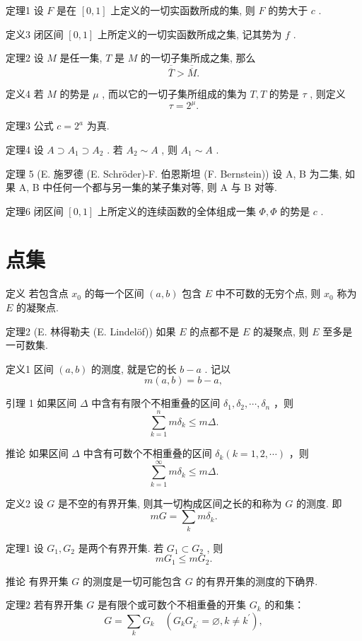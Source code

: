 \documentclass[]{article}
\begin{document}
定理1 设 $F$ 是在 $[0,1]$ 上定义的一切实函数所成的集, 则 $F$ 的势大于 $c$ . 

定义3 闭区间 $[0,1]$ 上所定义的一切实函数所成之集, 记其势为 $f$ . 

定理2 设 $M$ 是任一集, $T$ 是 $M$ 的一切子集所成之集, 那么 $$
\overline {{\overline {{T}}}} > \overline {{\overline {{M}}}}.
$$

定义4 若 $M$ 的势是 $\mu$ , 而以它的一切子集所组成的集为 $T, T$ 的势是 $\tau$ , 则定义 $$
\tau = 2 ^ {\mu}.
$$

定理3 公式 $c = 2^{a}$ 为真. 

定理4 设 $A \supset A_1 \supset A_2$ . 若 $A_2 \sim A$ , 则 $A_1 \sim A$ . 

定理 5 (E. 施罗德 (E. Schröder)-F. 伯恩斯坦 (F. Bernstein)) 设 A, B 为二集, 如果 A, B 中任何一个都与另一集的某子集对等, 则 A 与 B 对等. 

定理6 闭区间 $[0,1]$ 上所定义的连续函数的全体组成一集 $\Phi, \Phi$ 的势是 $c$ . 

\section{点集}

定义 若包含点 $x_0$ 的每一个区间 $(a, b)$ 包含 $E$ 中不可数的无穷个点, 则 $x_0$ 称为 $E$ 的凝聚点. 

定理2 (E. 林得勒夫 (E. Lindelöf)) 如果 $E$ 的点都不是 $E$ 的凝聚点, 则 $E$ 至多是一可数集. 

定义1 区间 $(a, b)$ 的测度, 就是它的长 $b - a$ . 记以 $$
m (a, b) = b - a,
$$

引理 1 如果区间 $\Delta$ 中含有有限个不相重叠的区间 $\delta_{1}, \delta_{2}, \cdots, \delta_{n}$ ，则 $$
\sum_ {k = 1} ^ {n} m \delta_ {k} \leqslant m \Delta .
$$

推论 如果区间 $\Delta$ 中含有可数个不相重叠的区间 $\delta_{k}(k=1,2,\cdots)$ ，则$$
\sum_ {k = 1} ^ {\infty} m \delta_ {k} \leqslant m \Delta .
$$

定义2 设 $G$ 是不空的有界开集, 则其一切构成区间之长的和称为 $G$ 的测度. 即 $$
m G = \sum_ {k} m \delta_ {k}.
$$

定理1 设 $G_{1}, G_{2}$ 是两个有界开集. 若 $G_{1} \subset G_{2}$ , 则 $$
m G _ {1} \leqslant m G _ {2}.
$$

推论 有界开集 $G$ 的测度是一切可能包含 $G$ 的有界开集的测度的下确界. 

定理2 若有界开集 $G$ 是有限个或可数个不相重叠的开集 $G_{k}$ 的和集：$$
G = \sum_ {k} G _ {k} \quad (G _ {k} G _ {k ^ {\prime}} = \varnothing , k \neq k ^ {\prime}),
$$  
\end{document}
